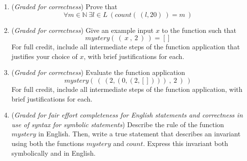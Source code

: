 \begin{enumerate}
   \begin{enumerate}
        \item ({\it Graded for correctness}) Prove that
            \[
                \forall m \in \mathbb{N}~ \exists l \in L ~\left( count(~(l,20)~) = m~ \right)
            \]

        \item ({\it Graded for correctness}) Give an example input $x$ to the function such that 
            \[
               mystery( ~(~ x ~,~ 2~) ~) = []
            \]
           For full credit, include all intermediate steps of the function application
           that justifies your choice of $x$, with brief justifications for each.

        \item ({\it Graded for correctness}) Evaluate the function application
            \[
                mystery( ~(~ (2, (0, (2, []) ) ) ~,~ 2~) ~)
            \]
         For full credit, include all intermediate steps of the function application,
         with brief justifications for each.
   
        \item ({\it Graded for fair effort completeness for English statements and correctness in use 
        of syntax for symbolic statements}) Describe the rule of the function 
        $mystery$ in English. Then, write a true statement that describes an invariant using
        both the functions $mystery$ and $count$. Express this invariant both symbolically 
        and in English.
    \end{enumerate}

\end{enumerate}

    
